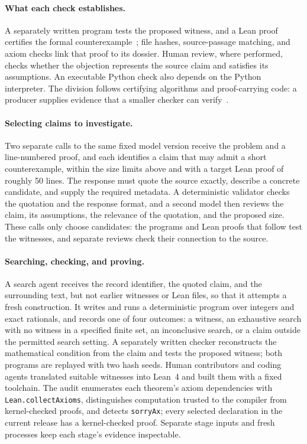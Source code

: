 \paragraph{What each check establishes.}
A separately written program tests the proposed witness, and a Lean proof certifies the formal counterexample~\citep{moura2021lean,mathlib2020}; file hashes, source-passage matching, and axiom checks link that proof to its dossier. Human review, where performed, checks whether the objection represents the source claim and satisfies its assumptions. An executable Python check also depends on the Python interpreter. The division follows certifying algorithms and proof-carrying code: a producer supplies evidence that a smaller checker can verify~\citep{mcconnell2011certifying,necula1997pcc}.

\paragraph{Selecting claims to investigate.}
Two separate calls to the same fixed model version receive the problem and a line-numbered proof, and each identifies a claim that may admit a short counterexample, within the size limits above and with a target Lean proof of roughly 50 lines. The response must quote the source exactly, describe a concrete candidate, and supply the required metadata. A deterministic validator checks the quotation and the response format, and a second model then reviews the claim, its assumptions, the relevance of the quotation, and the proposed size. These calls only choose candidates: the programs and Lean proofs that follow test the witnesses, and separate reviews check their connection to the source.

\paragraph{Searching, checking, and proving.}
A search agent receives the record identifier, the quoted claim, and the surrounding text, but not earlier witnesses or Lean files, so that it attempts a fresh construction. It writes and runs a deterministic program over integers and exact rationals, and records one of four outcomes: a witness, an exhaustive search with no witness in a specified finite set, an inconclusive search, or a claim outside the permitted search setting. A separately written checker reconstructs the mathematical condition from the claim and tests the proposed witness; both programs are replayed with two hash seeds. Human contributors and coding agents translated suitable witnesses into Lean~4 and built them with a fixed toolchain. The audit enumerates each theorem's axiom dependencies with \texttt{Lean.collectAxioms}, distinguishes computation trusted to the compiler from kernel-checked proofs, and detects \texttt{sorryAx}; every selected declaration in the current release has a kernel-checked proof. Separate stage inputs and fresh processes keep each stage's evidence inspectable.

